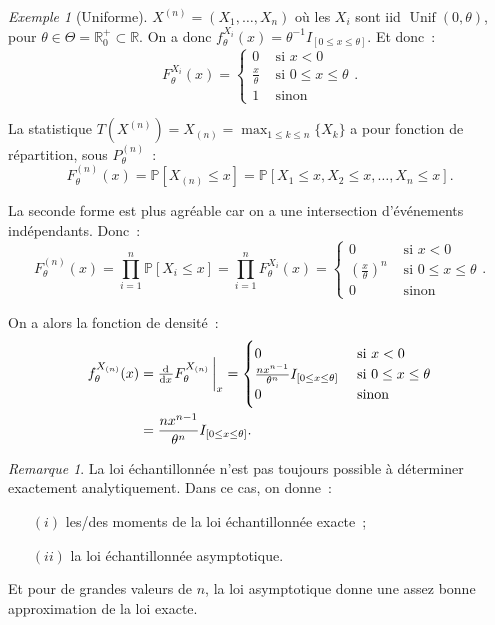 \documentclass{report}
\DeclareMathOperator{\Unif}{Unif}  %
\renewcommand{\P}{\mathbb P}
\newcommand{\R}{\mathbb R}
\newcommand{\charfun}[1]{I_{\left[#1\right]}}
\theoremstyle{definition}
\theoremstyle{remark}
\newtheorem*{rmq}{Remarque}
\newtheorem{ex}{Exemple}[chapter]
\begin{document}
		\begin{ex}[Uniforme] $X^{(n)} = (X_1, \ldots, X_n)$ où les $X_i$ sont iid $\Unif(0, \theta)$, pour $\theta \in \Theta = \R^+_0 \subset \R$.
		On a donc $f_\theta^{X_i}(x) = \theta^{-1}\charfun {0 \leq x \leq \theta}$. Et donc~:
		\[F_\theta^{X_i}(x) = \begin{cases}0 &\text{ si } x < 0 \\\frac x\theta &\text{ si } 0 \leq x \leq \theta \\1 &\text{ sinon}\end{cases}.\]

		La statistique $T(X^{(n)}) = X_{(n)} = \max_{1 \leq k \leq n}\{X_k\}$ a pour fonction de répartition, sous $P_\theta^{(n)}$~:
		\[F_\theta^{(n)}(x) = \P[X_{(n)} \leq x] = \P[X_1 \leq x, X_2 \leq x, \ldots, X_n \leq x].\]

		La seconde forme est plus agréable car on a une intersection d'événements indépendants. Donc~:
		\[F_\theta^{(n)}(x) = \prod_{i=1}^n\P[X_i \leq x] = \prod_{i=1}^nF_\theta^{X_i}(x) =
			\begin{cases}0 &\text{ si } x < 0 \\\left(\frac x\theta\right)^n &\text{ si } 0 \leq x \leq \theta \\0 &\text{ sinon}\end{cases}.\]

		On a alors la fonction de densité~:
		\begin{align*}
			f_\theta^{X_{(n)}}(x) &= \od {}xF_\theta^{X_{(n)}}\sVert[3]_x =
			\begin{cases}0 &\text{ si } x < 0 \\\frac {nx^{n-1}}{\theta^n}\charfun{0 \leq x \leq \theta} &\text{ si } 0\leq x \leq \theta \\0 &\text{ sinon}\end{cases} \\
			&= \frac {nx^{n-1}}{\theta^n}\charfun{0 \leq x \leq \theta}.
		\end{align*}
		\end{ex}

		\begin{rmq} La loi échantillonnée n'est pas toujours possible à déterminer exactement analytiquement. Dans ce cas, on donne~:
		\begin{itemize}
			\item[$(i)$] les/des moments de la loi échantillonnée exacte~;
			\item[$(ii)$] la loi échantillonnée asymptotique.
		\end{itemize}

		Et pour de grandes valeurs de $n$, la loi asymptotique donne une assez bonne approximation de la loi exacte.
		\end{rmq}
\end{document}
